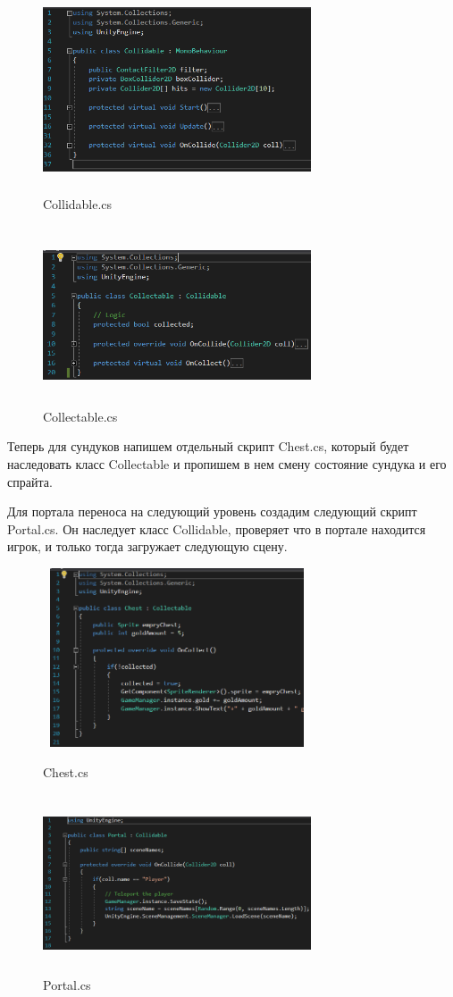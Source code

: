 \documentclass[a4paper,12pt]{article}
\begin{document}
\begin{figure}[h!]
\centering
\includegraphics[width = 300px, height=200px]{pictures/coll.png}
\caption{Collidable.cs}
\vspace{5mm}
\includegraphics[width = 300px, height=200px]{pictures/coll1.png}
\caption{Collectable.cs}
\end{figure}

Теперь для сундуков напишем отдельный скрипт Chest.cs, который будет наследовать класс Collectable и пропишем в нем смену состояние сундука и его спрайта.

Для портала переноса на следующий уровень создадим следующий скрипт Portal.cs. Он наследует класс Collidable, проверяет что в портале находится игрок, и только тогда загружает следующую сцену.

\begin{figure}[h!]
\centering
\includegraphics[width = 300px, height=200px]{pictures/chest.png}
\caption{Chest.cs}
\vspace{5mm}
\includegraphics[width = 300px, height=200px]{pictures/portal.png}
\caption{Portal.cs}
\end{figure}
\end{document}
